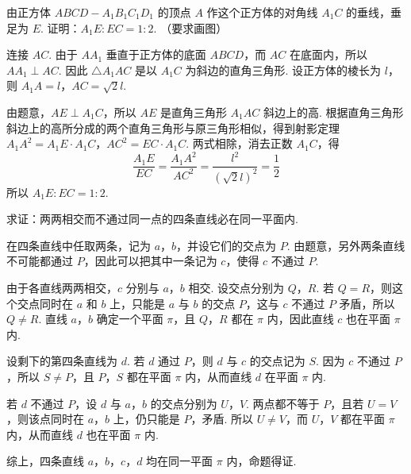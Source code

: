 \begin{problem}
由正方体 \(ABCD-A_1B_1C_1D_1\) 的顶点 \(A\) 作这个正方体的对角线 \(A_1C\) 的垂线，垂足为 \(E\). 证明：\(A_1E:EC=1:2\). （要求画图）
\end{problem}

\begin{solution}
连接 \(AC\). 由于 \(AA_1\) 垂直于正方体的底面 \(ABCD\)，而 \(AC\) 在底面内，所以 \(AA_1\perp AC\). 因此 \(\triangle A_1AC\) 是以 \(A_1C\) 为斜边的直角三角形. 设正方体的棱长为 \(l\)，则
\(A_1A=l\)，\(AC=\sqrt2l\).


由题意，\(AE\perp A_1C\)，所以 \(AE\) 是直角三角形 \(A_1AC\) 斜边上的高. 根据直角三角形斜边上的高所分成的两个直角三角形与原三角形相似，得到射影定理
\(A_1A^2=A_1E\cdot A_1C\)，\(AC^2=EC\cdot A_1C\).
两式相除，消去正数 \(A_1C\)，得
\[
\frac{A_1E}{EC}=\frac{A_1A^2}{AC^2}=\frac{l^2}{\left(\sqrt2l\right)^2}=\frac12
\]
所以 \(A_1E:EC=1:2\).
\end{solution}

\begin{problem}
求证：两两相交而不通过同一点的四条直线必在同一平面内.
\end{problem}

\begin{solution}
在四条直线中任取两条，记为 \(a\)，\(b\)，并设它们的交点为 \(P\). 由题意，另外两条直线不可能都通过 \(P\)，因此可以把其中一条记为 \(c\)，使得 \(c\) 不通过 \(P\).

由于各直线两两相交，\(c\) 分别与 \(a\)，\(b\) 相交. 设交点分别为 \(Q\)，\(R\). 若 \(Q=R\)，则这个交点同时在 \(a\) 和 \(b\) 上，只能是 \(a\) 与 \(b\) 的交点 \(P\)，这与 \(c\) 不通过 \(P\) 矛盾，所以 \(Q\neq R\). 直线 \(a\)，\(b\) 确定一个平面 \(\pi\)，且 \(Q\)，\(R\) 都在 \(\pi\) 内，因此直线 \(c\) 也在平面 \(\pi\) 内.

设剩下的第四条直线为 \(d\). 若 \(d\) 通过 \(P\)，则 \(d\) 与 \(c\) 的交点记为 \(S\). 因为 \(c\) 不通过 \(P\)，所以 \(S\neq P\)，且 \(P\)，\(S\) 都在平面 \(\pi\) 内，从而直线 \(d\) 在平面 \(\pi\) 内.

若 \(d\) 不通过 \(P\)，设 \(d\) 与 \(a\)，\(b\) 的交点分别为 \(U\)，\(V\). 两点都不等于 \(P\)，且若 \(U=V\)，则该点同时在 \(a\)，\(b\) 上，仍只能是 \(P\)，矛盾. 所以 \(U\neq V\)，而 \(U\)，\(V\) 都在平面 \(\pi\) 内，从而直线 \(d\) 也在平面 \(\pi\) 内.

综上，四条直线 \(a\)，\(b\)，\(c\)，\(d\) 均在同一平面 \(\pi\) 内，命题得证.
\end{solution}
